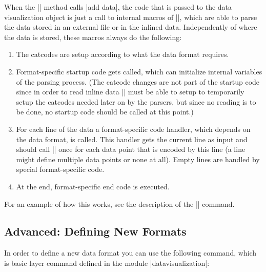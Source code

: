 \begin{command}{\pgfdata{}}
  When the |\pgfdata| method calls |add data|, the code that is passed
  to the data visualization object is just a call to internal macros
  of |\pgfdata|, which are able to parse the data stored in an
  external file or in the inlined data. Independently of where the
  data is stored, these macros always do the following:
  \begin{enumerate}
  \item The catcodes are setup according to what the data
    format requires.
  \item Format-specific startup code gets called, which can initialize
    internal 
    variables of the parsing process. (The catcode changes are not
    part of the startup code since in order to read inline data
    |\pgfdata| must be able to setup to temporarily setup the catcodes
    needed later on by the parsers, but since no reading is to be
    done, no startup code should be called at this point.)
  \item For each line of the data a format-specific code handler,
    which depends on the 
    data format, is called. This handler gets the current line as
    input and should call |\pgfdatapoint| once for each data point
    that is encoded by this line (a line might define multiple data
    points or none at all). Empty lines are handled by special
    format-specific code.
  \item At the end, format-specific end code is executed.    
  \end{enumerate}
  For an example of how this works, see the description of the
  |\pgfdeclaredataformat| command.
\end{command}


\subsection{Advanced: Defining New Formats}
\label{section-dv-declaring-formats}

In order to define a new data format you can use the following
command, which is basic layer command defined in the module
|datavisualization|:

